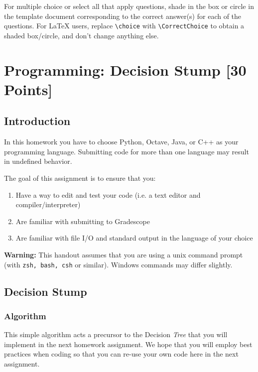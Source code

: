 \documentclass[11pt,addpoints,answers]{exam}
\numberwithin{equation}{section} %
\numberwithin{figure}{section} %
\numberwithin{table}{section} %
\begin{document}

For multiple choice or select all that apply questions, shade in the box or circle in the template document corresponding to the correct answer(s) for each of the questions. For \LaTeX{} users, replace \lstinline{\choice} with \lstinline{\CorrectChoice} to obtain a shaded box/circle, and don't change anything else.


\clearpage

%
\section{Programming: Decision Stump [30 Points]} 

\subsection{Introduction}

In this homework you have to choose Python, Octave, Java, or C++ as your programming language. Submitting code for more than one language may result in undefined behavior.

The goal of this assignment is to ensure that you:
\begin{enumerate}
    \item Have a way to edit and test your code (i.e. a text editor and compiler/interpreter)
    \item Are familiar with submitting to Gradescope
    \item Are familiar with file I/O and standard output in the language of your choice
\end{enumerate}

\textbf{Warning:} This handout assumes that you are using a unix command prompt (with \texttt{zsh, bash, csh} or similar). Windows commands may differ slightly.

\subsection{Decision Stump}

\subsubsection{Algorithm}

This simple algorithm acts a precursor to the Decision \emph{Tree} that you will implement in the next homework assignment. We hope that you will employ best practices when coding so that you can re-use your own code here in the next assignment. 
\end{document}
